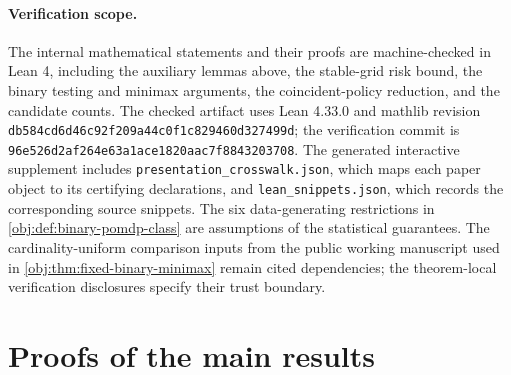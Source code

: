 \documentclass[11pt]{article}
\begin{document}
\paragraph{Verification scope.}
The internal mathematical statements and their proofs are machine-checked in Lean 4, including the auxiliary lemmas above, the stable-grid risk bound, the binary testing and minimax arguments, the coincident-policy reduction, and the candidate counts. The checked artifact uses Lean 4.33.0 and mathlib revision \texttt{db584cd6d46c92f2}\allowbreak\texttt{09a44c0f1c829460d327499d}; the verification commit is \texttt{96e526d2af264e63a1}\allowbreak\texttt{ace1820aac7f8843203708}. The generated interactive supplement includes \texttt{presentation\_crosswalk.json}, which maps each paper object to its certifying declarations, and \texttt{lean\_snippets.json}, which records the corresponding source snippets. The six data-generating restrictions in \cref{obj:def:binary-pomdp-class} are assumptions of the statistical guarantees. The cardinality-uniform comparison inputs from the public working manuscript used in \cref{obj:thm:fixed-binary-minimax} remain cited dependencies; the theorem-local verification disclosures specify their trust boundary.


\section{Proofs of the main results}\label{sec:deferred-proofs}
\end{document}

